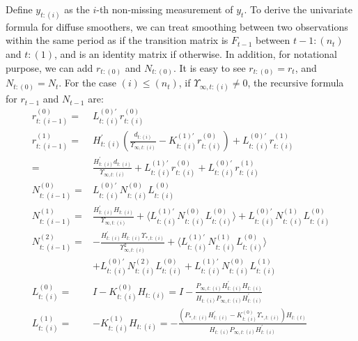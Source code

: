 \documentclass[10pt, titlepage]{article}
\numberwithin{equation}{section}
\begin{document}
Define $y_{t:(i)}$ as the $i$-th non-missing measurement of $y_t$. To derive the univariate formula for diffuse smoothers, we can treat smoothing between two observations within the same period as if the transition matrix is $F_{t-1}$ between $t-1:(n_t)$ and $t:(1)$, and is an identity matrix if otherwise. In addition, for notational purpose, we can add $r_{t:(0)}$ and $N_{t:(0)}$. It is easy to see $r_{t:(0)}=r_t$, and $N_{t:(0)}=N_t$. For the case $(i)\leq(n_t)$, if $\Upsilon_{\infty,t:(i)}\neq0$, the recursive formula for $r_{t-1}$ and $N_{t-1}$ are:
\begin{align}
    r_{t:(i-1)}^{(0)} =& L_{t:(i)}^{(0)'}r_{t:(i)}^{(0)} \label{eq:diff_uni_start} \\
    r_{t:(i-1)}^{(1)} =& H_{t:(i)}^{'}\left(\frac{d_{t:(i)}}{\Upsilon_{\infty,t:(i)}}-K_{t:(i)}^{(1)'}r_{t:(i)}^{(0)}\right)+L_{t:(i)}^{(0)'}r_{t:(i)}^{(1)} \nonumber \\
    =& \frac{H_{t:(i)}^{'}d_{t:(i)}}{\Upsilon_{\infty,t:(i)}} + L_{t:(i)}^{(1)'}r_{t:(i)}^{(0)} + L_{t:(i)}^{(0)'}r_{t:(i)}^{(1)} \\
    N_{t:(i-1)}^{(0)} =& L_{t:(i)}^{(0)'}N_{t:(i)}^{(0)}L_{t:(i)}^{(0)} \\
    N_{t:(i-1)}^{(1)} =& \frac{H_{t:(i)}^{'}H_{t:(i)}}{\Upsilon_{\infty,t:(i)}} + \langle L_{t:(i)}^{(1)'}N_{t:(i)}^{(0)}L_{t:(i)}^{(0)}\rangle + L_{t:(i)}^{(0)'}N_{t:(i)}^{(1)}L_{t:(i)}^{(0)} \\
    N_{t:(i-1)}^{(2)} =& -\frac{H_{t:(i)}^{'}H_{t:(i)}\Upsilon_{*,t:(i)}}{\Upsilon_{\infty,t:(i)}^{2}} + \langle L_{t:(i)}^{(1)'}N_{t:(i)}^{(1)}L_{t:(i)}^{(0)}\rangle \nonumber \\
    &+L_{t:(i)}^{(0)'}N_{t:(i)}^{(2)}L_{t:(i)}^{(0)} + L_{t:(i)}^{(1)'}N_{t:(i)}^{(0)}L_{t:(i)}^{(1)} \\
    L_{t:(i)}^{(0)} =& I-K_{t:(i)}^{(0)}H_{t:(i)}= I-\frac{P_{\infty,t:(i)}H_{t:(i)}^{'}H_{t:(i)}}{H_{t:(i)}P_{\infty,t:(i)}H_{t:(i)}^{'}} \\
    L_{t:(i)}^{(1)} =& - K_{t:(i)}^{(1)}H_{t:(i)}=-\frac{(P_{*,t:(i)}H_{t:(i)}^{'}-K_{t:(i)}^{(0)}\Upsilon_{*,t:(i)})H_{t:(t)}}{H_{t:(i)}P_{\infty,t:(i)}H_{t:(i)}^{'}}
\end{align}
\end{document}
